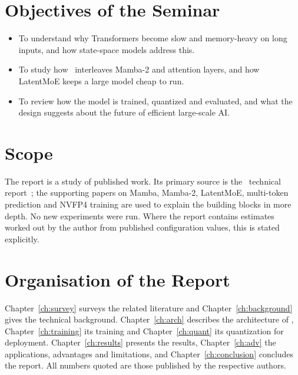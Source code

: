 \section{Objectives of the Seminar}

\begin{itemize}
  \item To understand why Transformers become slow and memory-heavy on long
        inputs, and how state-space models address this.
  \item To study how \NS\ interleaves Mamba-2 and attention layers, and how
        LatentMoE keeps a large model cheap to run.
  \item To review how the model is trained, quantized and evaluated, and what
        the design suggests about the future of efficient large-scale AI.
\end{itemize}

\section{Scope}

The report is a study of published work. Its primary source is the \NS\
technical report~\cite{nvidia2026super}; the supporting papers on Mamba,
Mamba-2, LatentMoE, multi-token prediction and NVFP4 training are used to
explain the building blocks in more depth. No new experiments were run. Where
the report contains estimates worked out by the author from published
configuration values, this is stated explicitly.

\section{Organisation of the Report}

Chapter~\ref{ch:survey} surveys the related literature and
Chapter~\ref{ch:background} gives the technical background.
Chapter~\ref{ch:arch} describes the architecture of \NS,
Chapter~\ref{ch:training} its training and Chapter~\ref{ch:quant} its
quantization for deployment. Chapter~\ref{ch:results} presents the results,
Chapter~\ref{ch:adv} the applications, advantages and limitations, and
Chapter~\ref{ch:conclusion} concludes the report. All numbers quoted are those
published by the respective authors.
